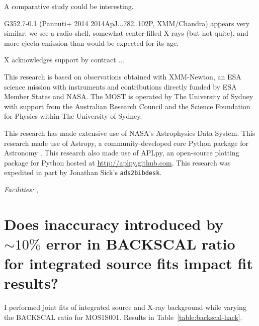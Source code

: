 \documentclass[preprint2,tighten,trackchanges]{aastex6}
\newcommand*{\abt}{\mathord{\sim}} %
\begin{document}
A comparative study could be interesting.

G352.7-0.1 (Pannuti+ 2014 2014ApJ...782..102P, XMM/Chandra) appears very
similar: we see a radio shell, somewhat center-filled X-rays (but not quite),
and more ejecta emission than would be expected for its age.


\acknowledgments

X acknowledges support by contract ...

This research is based on observations obtained with XMM-Newton, an ESA science
mission with instruments and contributions directly funded by ESA Member States
and NASA.
The MOST is operated by The University of Sydney with support from the
Australian Research Council and the Science Foundation for Physics within The
University of Sydney.

This research has made extensive use of NASA's Astrophysics Data System.
This research made use of Astropy, a community-developed core Python package
for Astronomy \citep{astropy2013}.
This research also made use of APLpy, an open-source plotting package for
Python hosted at \href{http://aplpy.github.com}{http://aplpy.github.com}.
This research was expedited in part by Jonathan Sick's \texttt{ads2bibdesk}.

{\it Facilities:} , 






\newpage
\clearpage  %
\appendix

\setcounter{table}{0}
\renewcommand{\thetable}{A\arabic{table}}
\setcounter{figure}{0}
\renewcommand{\thefigure}{A\arabic{figure}}

\section{Does inaccuracy introduced by $\abt 10\%$ error in BACKSCAL ratio for
integrated source fits impact fit results?}

I performed joint fits of integrated source and X-ray background while
varying the BACKSCAL ratio for MOS1S001.
Results in Table~\ref{table:backscal-hack}.
\end{document}
